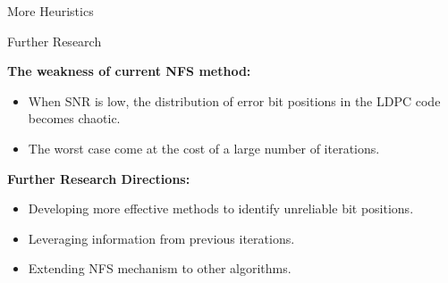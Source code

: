 \documentclass[aspectratio=169,8pt]{beamer}
\begin{document}
\begin{frame}{More Heuristics}
  \centering
  \begin{minipage}{0.9\textwidth}
    \begin{block}{Further Research}

        \textbf{The weakness of current NFS method:}
          \begin{itemize}
            \itemsep0.5em  %
            \item When SNR is low, the distribution of error bit positions in the LDPC code becomes chaotic.
            \item The worst case come at the cost of a large number of iterations.
          \end{itemize}
        
        \vspace{\baselineskip}  

        \textbf{Further Research Directions:}
          \begin{itemize}
            \itemsep0.5em
              
              \item Developing more effective methods to identify unreliable bit positions.
              \item Leveraging information from previous iterations.
              \item Extending NFS mechanism to other algorithms.

          \end{itemize}

    \end{block}
  \end{minipage}
\end{frame}




{\aauwavesbg
\begin{frame}
  \LARGE
\end{frame}}
\end{document}
